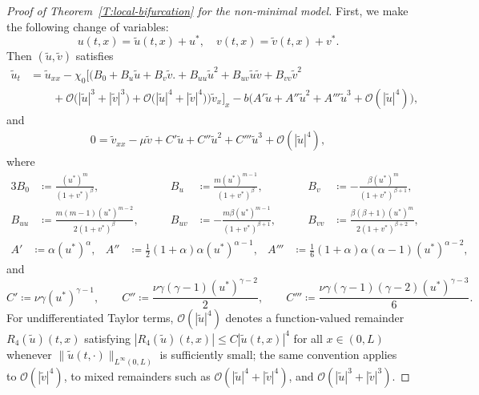 \documentclass[11pt]{article} %
\theoremstyle{remark}
\theoremstyle{remark}
\numberwithin{equation}{section}
\numberwithin{figure}{section}
\numberwithin{table}{section}
\begin{document}
\begin{proof}[Proof of Theorem~\ref{T:local-bifurcation}  for the non-minimal model]
  First, we make the following change of variables:
  \[
    u(t,x)=\tilde{u}(t,x)+u^*,\quad v(t,x)=\tilde{v}(t,x)+v^*.
  \]
  Then $(\tilde{u},\tilde{v})$ satisfies
  \begin{align}\label{E:local-bifurcation-eq2}
    \tilde{u}_t
    & = \tilde{u}_{xx}
    - \chi_0\Big[\Big( B_0
    + B_u\tilde{u}
    + B_v\tilde{v}\Big. \nonumber
    + B_{uu}\tilde{u}^2
    + B_{uv}\tilde{u}\tilde{v}
    + B_{vv}\tilde{v}^2 \nonumber \\
    & \qquad +  {\mathcal{O}\big(|\tilde{u}|^3+|\tilde{v}|^3  \big) }
    + \mathcal{O}\big(|\tilde{u}|^4+|\tilde{v}|^4\big)\Big)\tilde{v}_x\Big]_x  -
    b\Big( A'\tilde{u}
    + A''\tilde{u}^2  + A'''\tilde{u}^3
    + \mathcal{O}(|\tilde{u}|^4)\Big),
  \end{align}
  and
  \begin{align}\label{E:local-bifurcation-eq3}
    0 = \tilde{v}_{xx} - \mu\tilde{v} + C'\tilde{u} +  C'' \tilde{u}^2
    + C'''\tilde{u}^3
    + \mathcal{O}(|\tilde{u}|^4),
  \end{align}
  where
  \begin{alignat}{3}
    B_0 & \coloneqq \frac{(u^*)^m}{(1+v^*)^\beta}, & \qquad B_u & \coloneqq
    \frac{m(u^*)^{m-1}}{(1+v^*)^\beta}, & \qquad B_v & \coloneqq
    -\frac{\beta(u^*)^m}{(1+v^*)^{\beta+1}}, \label{E:B0-Bu-Bv-eq} \\[6pt]
    B_{uu} & \coloneqq \frac{m(m-1)(u^*)^{m-2}}{2(1+v^*)^\beta}, & \qquad
    B_{uv} & \coloneqq -\frac{m\beta(u^*)^{m-1}}{(1+v^*)^{\beta+1}}, & \qquad
    B_{vv} & \coloneqq \frac{\beta(\beta+1)(u^*)^m}{2(1+v^*)^{\beta+2}},
    \label{E:Buu-Buv-Bvv-eq}
  \end{alignat}
  \begin{align}\label{E:L1-L2-eq}
    A' & \coloneqq \alpha(u^*)^\alpha,
    & A''  & \coloneqq \tfrac{1}{2}(1+\alpha)\alpha(u^*)^{\alpha-1},
    & A''' & \coloneqq
    \tfrac{1}{6}(1+\alpha)\alpha(\alpha-1)(u^*)^{\alpha-2},
  \end{align}
  and
  \begin{equation}\label{E:C-const}
    C' \coloneqq \nu\gamma(u^*)^{\gamma-1}, \qquad
    C'' \coloneqq \frac{\nu\gamma(\gamma-1)(u^*)^{\gamma-2}}{2}, \qquad
    C''' \coloneqq \frac{\nu\gamma(\gamma-1)(\gamma-2)(u^*)^{\gamma-3}}{6}.
  \end{equation}
  For undifferentiated Taylor terms, $\mathcal{O}(|\tilde{u}|^4)$ denotes a
  function-valued remainder $R_4(\tilde{u})(t,x)$ satisfying
  $|R_4(\tilde{u})(t,x)| \le C |\tilde{u}(t,x)|^4$ for all $x \in (0, L)$
  whenever $\|{\tilde{u}(t,\cdot)}\|_{L^\infty(0,L)}$ is sufficiently small; the
  same convention applies to $\mathcal{O}(|\tilde{v}|^4)$, to mixed remainders
  such as $\mathcal{O}(|\tilde{u}|^4 + |\tilde{v}|^4)$, and
  $\mathcal{O}(|\tilde{u}|^3 + |\tilde{v}|^3)$.


\end{proof}
\end{document}
